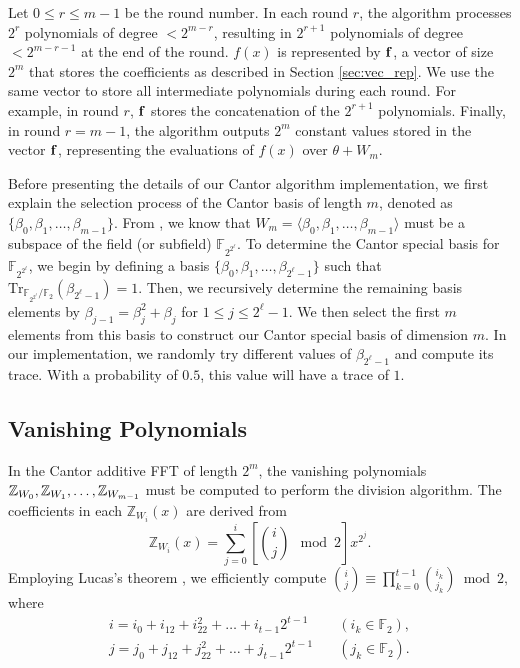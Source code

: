 Let $0 \leq r \leq m-1$ be the round number. In each round $r$, the algorithm processes $2^r$ polynomials of degree $< 2^{m-r}$, resulting in $2^{r+1}$ polynomials of degree $< 2^{m-r-1}$ at the end of the round. $f(x)$ is represented by ${\bf{f}}$, a vector of size $2^m$ that stores the coefficients as described in Section \ref{sec:vec_rep}. We use the same vector to store all intermediate polynomials during each round. For example, in round $r$, ${\bf{f}}$ stores the concatenation of  the $2^{r+1}$ polynomials. Finally, in round $r = m-1$, the algorithm outputs $2^m$ constant values stored in the vector ${\bf{f}}$, representing the evaluations of $f(x)$ over $\theta + W_m$. 

Before presenting the details of our Cantor algorithm implementation, we first explain the selection process of the Cantor basis of length $m$, denoted as $\{\beta_0, \beta_1, \ldots, \beta_{m-1}\}$. From \cite[Appendix]{Gao2010FFT}, we know that $W_m = \langle \beta_0, \beta_1, \ldots, \beta_{m-1} \rangle$ must be a subspace of the field (or subfield) $\mathbb{F}_{2^{2^\ell}}$. To determine the Cantor special basis for $\mathbb{F}_{2^{2^\ell}}$, we begin by defining a basis $\{\beta_0, \beta_1, \ldots, \beta_{2^\ell-1}\}$ such that $\text{Tr}_{\mathbb{F}_{2^{2^\ell}}/\mathbb{F}_2}(\beta_{2^\ell-1}) = 1$. Then, we recursively determine the remaining basis elements by $\beta_{j-1} = \beta_j^2 + \beta_j$ for $1 \leq j \leq 2^\ell-1$. We then select the first $m$ elements from this basis to construct our Cantor special basis of dimension $m$. In our implementation, we randomly try different values of $\beta_{2^\ell-1}$ and compute its trace. With a probability of $0.5$, this value will have a trace of $1$.


\subsection{Vanishing Polynomials}
\label{sec:Vanishing Polynomials}
In the Cantor additive FFT of length $2^m$, the vanishing polynomials $\splitatcommas{\mathbb{Z}_{W_{0}}, \mathbb{Z}_{W_{1}}, \ldots, \mathbb{Z}_{W_{m-1}}}$ must be computed to perform the division algorithm. The coefficients in each $\mathbb{Z}_{W_{i}}(x)$ are derived from
\[
\mathbb{Z}_{W_{i}}(x) = \sum_{j=0}^{i} \left[{i \choose j} \mod 2\right] x^{2^j}.
\]
Employing Lucas's theorem \cite{Lucas1878}, we efficiently compute
$
{i \choose j} \equiv \prod_{k=0}^{t-1} {i_k \choose j_k} \bmod 2,
$
where 
\[
\begin{aligned}
	i = i_0 + i_12 + i_22^2 + \dots + i_{t-1}2^{t-1} \quad &(i_k \in \mathbb{F}_2), \\
	j = j_0 + j_12 + j_22^2 + \dots + j_{t-1}2^{t-1} \quad &(j_k \in \mathbb{F}_2).\\
\end{aligned}
\]

